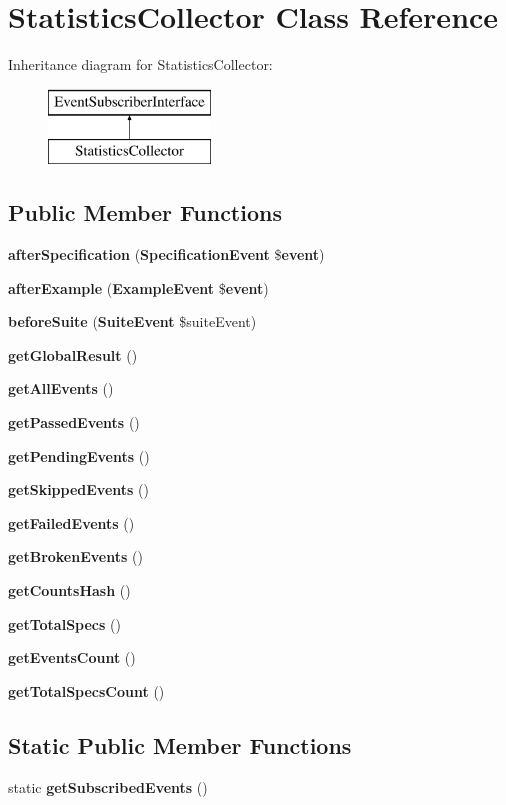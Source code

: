 \section{Statistics\+Collector Class Reference}
\label{class_php_spec_1_1_listener_1_1_statistics_collector}
Inheritance diagram for Statistics\+Collector\+:\begin{figure}[H]
\begin{center}
\leavevmode
\includegraphics[height=2.000000cm]{class_php_spec_1_1_listener_1_1_statistics_collector}
\end{center}
\end{figure}
\subsection*{Public Member Functions}
\begin{DoxyCompactItemize}
\item 
{\bf after\+Specification} ({\bf Specification\+Event} \${\bf event})
\item 
{\bf after\+Example} ({\bf Example\+Event} \${\bf event})
\item 
{\bf before\+Suite} ({\bf Suite\+Event} \$suite\+Event)
\item 
{\bf get\+Global\+Result} ()
\item 
{\bf get\+All\+Events} ()
\item 
{\bf get\+Passed\+Events} ()
\item 
{\bf get\+Pending\+Events} ()
\item 
{\bf get\+Skipped\+Events} ()
\item 
{\bf get\+Failed\+Events} ()
\item 
{\bf get\+Broken\+Events} ()
\item 
{\bf get\+Counts\+Hash} ()
\item 
{\bf get\+Total\+Specs} ()
\item 
{\bf get\+Events\+Count} ()
\item 
{\bf get\+Total\+Specs\+Count} ()
\end{DoxyCompactItemize}
\subsection*{Static Public Member Functions}
\begin{DoxyCompactItemize}
\item 
static {\bf get\+Subscribed\+Events} ()
\end{DoxyCompactItemize}


